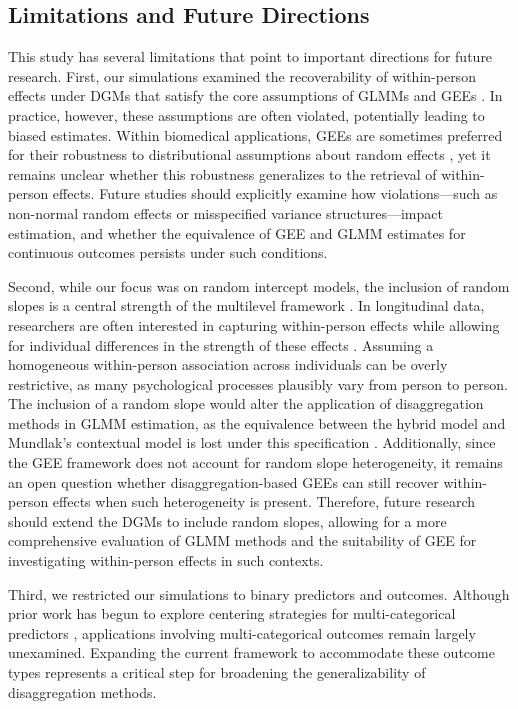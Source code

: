 \documentclass[stu]{apa7}
\begin{document}
\subsection{Limitations and Future Directions}

This study has several limitations that point to important directions for future research. First, our simulations examined the recoverability of within-person effects under DGMs that satisfy the core assumptions of GLMMs and GEEs \parencite[see][]{mcneish_unnecessary_2017}. In practice, however, these assumptions are often violated, potentially leading to biased estimates. Within biomedical applications, GEEs are sometimes preferred for their robustness to distributional assumptions about random effects \parencite{hubbard_gee_2010}, yet it remains unclear whether this robustness generalizes to the retrieval of within-person effects. Future studies should explicitly examine how violations—such as non-normal random effects or misspecified variance structures—impact estimation, and whether the equivalence of GEE and GLMM estimates for continuous outcomes persists under such conditions.

Second, while our focus was on random intercept models, the inclusion of random slopes is a central strength of the multilevel framework \parencite{bell_explaining_2015}. In longitudinal data, researchers are often interested in capturing within-person effects while allowing for individual differences in the strength of these effects \parencite[e.g.,][]{geschwind_mindfulness_2011}. Assuming a homogeneous within-person association across individuals can be overly restrictive, as many psychological processes plausibly vary from person to person. The inclusion of a random slope would alter the application of disaggregation methods in GLMM estimation, as the equivalence between the hybrid model and Mundlak’s contextual model is lost under this specification \parencite[]{snijders_multilevel_2011}. Additionally, since the GEE framework does not account for random slope heterogeneity, it remains an open question whether disaggregation-based GEEs can still recover within-person effects when such heterogeneity is present. Therefore, future research should extend the DGMs to include random slopes, allowing for a more comprehensive evaluation of GLMM methods and the suitability of GEE for investigating within-person effects in such contexts. 

Third, we restricted our simulations to binary predictors and outcomes. Although prior work has begun to explore centering strategies for multi-categorical predictors \parencite[e.g.,][]{yaremych_centering_2023}, applications involving multi-categorical outcomes remain largely unexamined. Expanding the current framework to accommodate these outcome types represents a critical step for broadening the generalizability of disaggregation methods.
\end{document}
